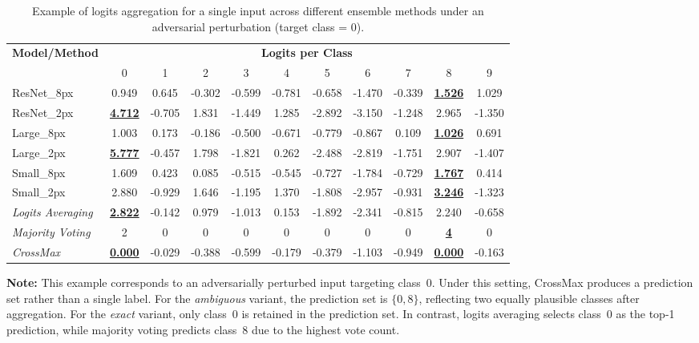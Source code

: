 \begin{table}[h]
\centering
\caption{Example of logits aggregation for a single input across different ensemble methods under an adversarial perturbation (target class = 0).}
\label{tab:ensemble_example}
\renewcommand{\arraystretch}{1.2}
\small
\begin{tabular}{lcccccccccc}
\toprule
\textbf{Model/Method} & \multicolumn{10}{c}{\textbf{Logits per Class}} \\
\cmidrule(lr){2-11}
 & 0 & 1 & 2 & 3 & 4 & 5 & 6 & 7 & 8 & 9 \\
\midrule
ResNet\_8px   & 0.949 & 0.645 & -0.302 & -0.599 & -0.781 & -0.658 & -1.470 & -0.339 & \underline{\textbf{1.526}} & 1.029 \\
ResNet\_2px   & \underline{\textbf{4.712}} & -0.705 & 1.831 & -1.449 & 1.285 & -2.892 & -3.150 & -1.248 & 2.965 & -1.350 \\
Large\_8px    & 1.003 & 0.173 & -0.186 & -0.500 & -0.671 & -0.779 & -0.867 & 0.109 & \underline{\textbf{1.026}} & 0.691 \\
Large\_2px    & \underline{\textbf{5.777}} & -0.457 & 1.798 & -1.821 & 0.262 & -2.488 & -2.819 & -1.751 & 2.907 & -1.407 \\
Small\_8px    & 1.609 & 0.423 & 0.085 & -0.515 & -0.545 & -0.727 & -1.784 & -0.729 & \underline{\textbf{1.767}} & 0.414 \\
Small\_2px    & 2.880 & -0.929 & 1.646 & -1.195 & 1.370 & -1.808 & -2.957 & -0.931 & \underline{\textbf{3.246}} & -1.323 \\
\midrule
\textit{Logits Averaging} & \underline{\textbf{2.822}} & -0.142 & 0.979 & -1.013 & 0.153 & -1.892 & -2.341 & -0.815 & 2.240 & -0.658 \\
\textit{Majority Voting}  & 2 & 0 & 0 & 0 & 0 & 0 & 0 & 0 & \underline{\textbf{4}} & 0 \\
\textit{CrossMax}         & \underline{\textbf{0.000}} & -0.029 & -0.388 & -0.599 & -0.179 & -0.379 & -1.103 & -0.949 & \underline{\textbf{0.000}} & -0.163 \\
\bottomrule
\end{tabular}

\vspace{0.5em}
\footnotesize
\raggedright
\textbf{Note:} This example corresponds to an adversarially perturbed input targeting class~0. 
Under this setting, CrossMax produces a prediction set rather than a single label. 
For the \textit{ambiguous} variant, the prediction set is $\{0, 8\}$, reflecting two equally plausible classes after aggregation. 
For the \textit{exact} variant, only class~0 is retained in the prediction set. 
In contrast, logits averaging selects class~0 as the top-1 prediction, while majority voting predicts class~8 due to the highest vote count.
\end{table}


